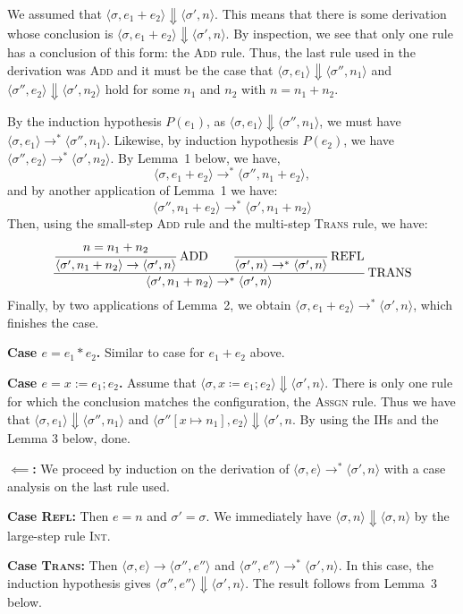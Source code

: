 {We assumed that $\langle \sigma, e_1 + e_2 \rangle \Downarrow \langle \sigma', n \rangle$. This
means that there is some derivation whose conclusion is $\langle \sigma, e_1 + e_2 \rangle
\Downarrow \langle \sigma', n \rangle$. By inspection, we see that only one rule has a
conclusion of this form: the \textsc{Add} rule. Thus, the last rule used in the derivation was
\textsc{Add} and it must be the case that $\langle \sigma, e_1 \rangle \Downarrow \langle
\sigma'', n_1 \rangle$ and $\langle \sigma'', e_2 \rangle \Downarrow \langle \sigma', n_2
\rangle$ hold for some $n_1$ and $n_2$ with $n = n_1 + n_2$.

By the induction hypothesis $P(e_1)$, as $\langle \sigma, e_1 \rangle \Downarrow \langle
\sigma'', n_1 \rangle$, we must have $\langle \sigma, e_1 \rangle \to^* \langle \sigma'', n_1
\rangle$. Likewise, by induction hypothesis $P(e_2)$, we have $\langle \sigma'', e_2 \rangle
\to^* \langle \sigma', n_2 \rangle$. By Lemma~1 below, we have,
\[
\langle \sigma, e_1 + e_2 \rangle \to^* \langle \sigma'', n_1 + e_2 \rangle,
\]
and by another application of Lemma~1 we have:
\[
\langle \sigma'', n_1 + e_2 \rangle \to^* \langle \sigma', n_1 + n_2 \rangle
\]
Then, using the small-step \textsc{Add} rule and the multi-step \textsc{Trans} rule, we have:
\[
\cfrac{
\cfrac{n = n_1 + n_2}{\langle \sigma', n_1 + n_2 \rangle \to \langle \sigma', n \rangle} \;
\text{ADD}
\qquad
\cfrac{}{\langle \sigma', n \rangle \to^* \langle \sigma', n \rangle} \; \text{REFL}
}{\langle \sigma', n_1 + n_2 \rangle \to^* \langle \sigma', n \rangle} \; \text{TRANS}
\]
Finally, by two applications of Lemma~2, we obtain $\langle \sigma, e_1 + e_2 \rangle \to^*
\langle \sigma', n \rangle$, which finishes the case.

\medskip
\noindent\textbf{Case $e = e_1 * e_2$.} Similar to case for $e_1 + e_2$ above.

\medskip
\noindent\textbf{Case $e = x := e_1; e_2$.} Assume that $ \langle \sigma, x \coloneq e_1; e_2 \rangle \Downarrow \langle \sigma', n \rangle $. There is only one rule for which the conclusion matches the configuration, the \textsc{Assgn} rule. Thus we have that $ \langle \sigma, e_1 \rangle \Downarrow \langle \sigma'', n_1 \rangle $ and $ \langle \sigma''[x \mapsto n_1], e_2 \rangle \Downarrow \langle \sigma', n $. By using the IHs and the Lemma 3 below, done.

\medskip
\noindent$\boldsymbol{\impliedby}$\textbf{:} We proceed by induction on the derivation of
$\langle \sigma, e \rangle \to^* \langle \sigma', n \rangle$ with a case analysis on the last
rule used.

\medskip
\noindent\textbf{Case \textsc{Refl}:} Then $e = n$ and $\sigma' = \sigma$. We immediately have
$\langle \sigma, n \rangle \Downarrow \langle \sigma, n \rangle$ by the large-step rule
\textsc{Int}.

\medskip
\noindent\textbf{Case \textsc{Trans}:} Then $\langle \sigma, e \rangle \to \langle \sigma'',
e'' \rangle$ and $\langle \sigma'', e'' \rangle \to^* \langle \sigma', n \rangle$. In this
case, the induction hypothesis gives $\langle \sigma'', e'' \rangle \Downarrow \langle \sigma',
n \rangle$. The result follows from Lemma~3 below.
}


